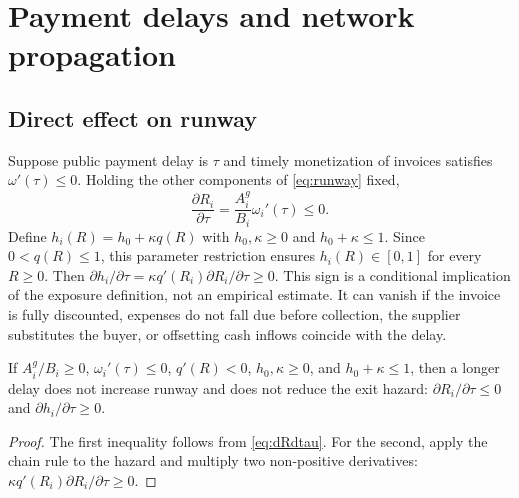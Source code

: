 \documentclass[11pt,a4paper]{article}
\begin{document}
\section{Payment delays and network propagation}
\subsection{Direct effect on runway}
Suppose public payment delay is $\tau$ and timely monetization of invoices satisfies $\omega'(\tau)\leq0$. Holding the other components of \eqref{eq:runway} fixed,
\begin{equation}
\frac{\partial R_i}{\partial\tau}=\frac{A_i^g}{B_i}\omega_i'(\tau)\leq0. \label{eq:dRdtau}
\end{equation}
Define $h_i(R)=h_0+\kappa q(R)$ with $h_0,\kappa\geq0$ and $h_0+\kappa\leq1$. Since $0<q(R)\leq1$, this parameter restriction ensures $h_i(R)\in[0,1]$ for every $R\geq0$. Then $\partial h_i/\partial\tau=\kappa q'(R_i)\partial R_i/\partial\tau\geq0$. This sign is a conditional implication of the exposure definition, not an empirical estimate. It can vanish if the invoice is fully discounted, expenses do not fall due before collection, the supplier substitutes the buyer, or offsetting cash inflows coincide with the delay.

\begin{proposition}
If $A_i^g/B_i\geq0$, $\omega_i'(\tau)\leq0$, $q'(R)<0$, $h_0,\kappa\geq0$, and $h_0+\kappa\leq1$, then a longer delay does not increase runway and does not reduce the exit hazard: $\partial R_i/\partial\tau\leq0$ and $\partial h_i/\partial\tau\geq0$.
\end{proposition}
\begin{proof}
The first inequality follows from \eqref{eq:dRdtau}. For the second, apply the chain rule to the hazard and multiply two non-positive derivatives: $\kappa q'(R_i)\partial R_i/\partial\tau\geq0$.\end{proof}
\end{document}
